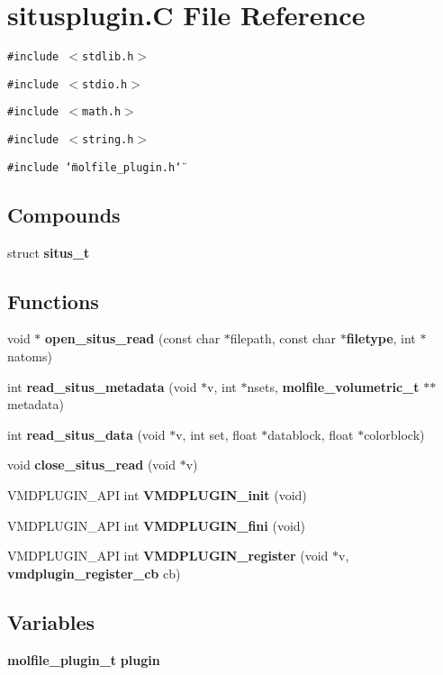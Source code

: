 \section{situsplugin.C File Reference}
\label{situsplugin_8C}
{\tt \#include $<$stdlib.h$>$}\par
{\tt \#include $<$stdio.h$>$}\par
{\tt \#include $<$math.h$>$}\par
{\tt \#include $<$string.h$>$}\par
{\tt \#include \char`\"{}molfile\_\-plugin.h\char`\"{}}\par
\subsection*{Compounds}
\begin{CompactItemize}
\item 
struct {\bf situs\_\-t}
\end{CompactItemize}
\subsection*{Functions}
\begin{CompactItemize}
\item 
void $\ast$ {\bf open\_\-situs\_\-read} (const char $\ast$filepath, const char $\ast${\bf filetype}, int $\ast$natoms)
\item 
int {\bf read\_\-situs\_\-metadata} (void $\ast$v, int $\ast$nsets, {\bf molfile\_\-volumetric\_\-t} $\ast$$\ast$metadata)
\item 
int {\bf read\_\-situs\_\-data} (void $\ast$v, int set, float $\ast$datablock, float $\ast$colorblock)
\item 
void {\bf close\_\-situs\_\-read} (void $\ast$v)
\item 
VMDPLUGIN\_\-API int {\bf VMDPLUGIN\_\-init} (void)
\item 
VMDPLUGIN\_\-API int {\bf VMDPLUGIN\_\-fini} (void)
\item 
VMDPLUGIN\_\-API int {\bf VMDPLUGIN\_\-register} (void $\ast$v, {\bf vmdplugin\_\-register\_\-cb} cb)
\end{CompactItemize}
\subsection*{Variables}
\begin{CompactItemize}
\item 
{\bf molfile\_\-plugin\_\-t} {\bf plugin}
\end{CompactItemize}



